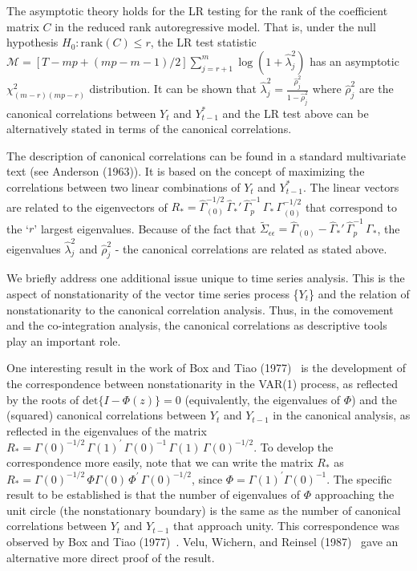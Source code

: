 The asymptotic theory holds for the LR testing for the rank of the coefficient matrix $C$ in the reduced rank autoregressive  model. That is, under the null hypothesis $H_0\!:\!\mbox{rank}(C) \leq r$, the LR test statistic ${\mathcal{M}} = [T\!-\!mp+(mp-m-1)/2] \sum_{j = r + 1}^{m} \log (1+\hat{\lambda}_{j}^{2})$ has an asymptotic $\chi_{(m-r)(mp-r)}^{2}$ distribution. It can be shown that $\hat{\lambda}_j^2=\frac{\hat{\rho}_j^2}{1-\hat{\rho}_j^2}$ where $\hat{\rho}_j^2$ are the canonical correlations between $Y_t$ and $Y_{t-1}^*$ and the LR test above can be alternatively stated in terms of the canonical correlations.


The description of canonical correlations can be found in a standard multivariate text (see Anderson (1963)). It is based on the concept of maximizing the correlations between two linear combinations of $Y_t$ and $Y_{t-1}^*$. The linear vectors are related to the eigenvectors of $R_*=\hat{\Gamma}_{(0)}^{-1/2}\, \hat{\Gamma}_*' \,\hat{\Gamma}_p^{-1}\, \Gamma_* \,\Gamma_{(0)}^{-1/2}$ that correspond to the `$r$' largest eigenvalues. Because of the fact that $\tilde{\Sigma}_{\epsilon\epsilon}=\hat{\Gamma}_{(0)} - \hat{\Gamma}_*' \,\hat{\Gamma}_p^{-1} \, \Gamma_*$, the eigenvalues $\hat{\lambda}_j^2$ and $\hat{\rho}_j^2$ - the canonical correlations are related as stated above.


We briefly address one additional issue unique to time series analysis.  This is the aspect of nonstationarity of the vector time series process \{$Y_t$\} and the relation of nonstationarity to the canonical correlation analysis. Thus, in the comovement and the co-integration analysis, the canonical correlations as descriptive tools play an important role.


One interesting result in the work of Box and Tiao (1977)~\cite{box77} is the development of the correspondence between nonstationarity in the VAR(1) process, as reflected by the roots of $\mbox{det}\{ I - \Phi(z) \} = 0$ (equivalently, the eigenvalues of $\Phi$) and the (squared) canonical correlations between $Y_t$ and $Y_{t-1}$ in the canonical analysis, as reflected in the eigenvalues of the matrix $R_* = \Gamma (0)^{-1/2}\, \Gamma (1)^{\prime}\, \Gamma (0)^{-1}\, \Gamma (1)\, \Gamma (0)^{-1/2}$. To develop the correspondence more easily, note that we can write the matrix $R_*$ as $R_* = \Gamma (0)^{-1/2}\, \Phi \Gamma (0)\, \Phi^{\prime}\, \Gamma (0)^{-1/2}$, since $\Phi = \Gamma (1)^{\prime} \Gamma (0)^{-1}$. The specific result to be established is that the number of eigenvalues of $\Phi$ approaching the unit circle (the nonstationary boundary) is the same as the number of canonical correlations between $Y_t$ and $Y_{t-1}$ that approach unity.  This correspondence was observed by Box and Tiao (1977)~\cite{box77}. Velu, Wichern, and Reinsel (1987)~\cite{velucanon} gave an alternative more direct proof of the result.


